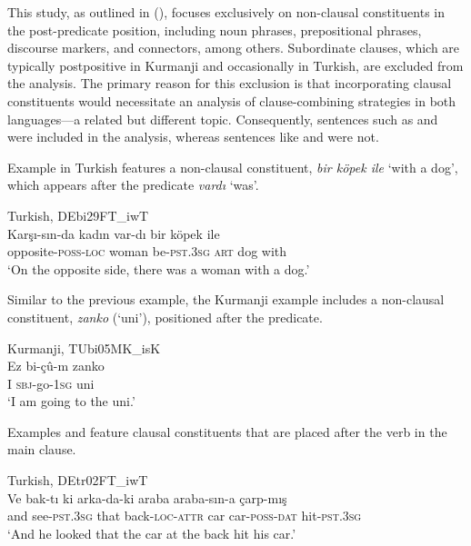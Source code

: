 This study, as outlined in (), focuses exclusively on non-clausal constituents in the post-predicate position, including noun phrases, prepositional phrases, discourse markers, and connectors, among others. Subordinate clauses, which are typically postpositive in Kurmanji and occasionally in Turkish, are excluded from the analysis. The primary reason for this exclusion is that incorporating clausal constituents would necessitate an analysis of clause-combining strategies in both languages—a related but different topic. Consequently, sentences such as  and  were included in the analysis, whereas sentences like  and  were not.

Example  in Turkish features a non-clausal constituent, \textit{bir köpek ile} ‘with a dog’, which appears after the predicate \textit{vardı} ‘was’.

\ea%
  \label{ex:key:27} Turkish, DEbi29FT\_iwT \\
        \gll Karşı-sın-da    kadın    var-dı    bir  köpek  ile\footnotemark{}  \\
opposite-\textsc{poss-loc}  woman    be-\textsc{pst.3sg}  \textsc{art}  dog  with\\
\glt ‘On the opposite side, there was a woman with a dog.’ 
  \z

Similar to the previous example, the Kurmanji example  includes a non-clausal constituent, \textit{zanko} (‘uni’), positioned after the predicate.

\ea%
  \label{ex:key:28} Kurmanji, TUbi05MK\_isK \\
\gll         Ez   bi-çû-m   zanko \\
I  \textsc{sbj}-go-\textsc{1sg}  uni\\
\glt ‘I am going to the uni.’ 
  \z

Examples  and  feature clausal constituents that are placed after the verb in the main clause.

\ea \label{ex:key:29} Turkish, DEtr02FT\_iwT \\
\gll Ve  bak-tı    ki  arka-da-ki  araba  araba-sın-a   çarp-mış\\
and  see-\textsc{pst.3sg}  that  back-\textsc{loc-attr}  car  car-\textsc{poss-dat}  hit-\textsc{pst.3sg}\\
\glt ‘And he looked that the car at the back hit his car.’ 
\z

